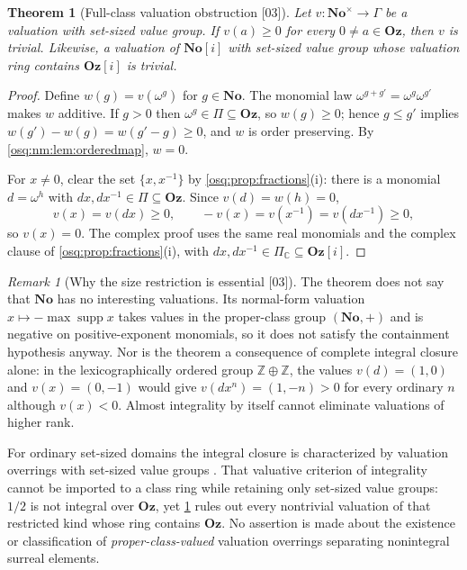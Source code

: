 \documentclass[11pt,letterpaper]{article}
\numberwithin{equation}{section}
\newtheorem{theorem}{Theorem}[section]
\theoremstyle{definition}
\theoremstyle{remark}
\newtheorem{remark}[remark]{Remark}
\theoremstyle{plain}
\newcommand{\No}{\mathbf{No}}
\newcommand{\Oz}{\mathbf{Oz}}
\newcommand{\SC}{\No[i]}
\newcommand{\GOz}{\Oz[i]}
\newcommand{\Z}{\mathbb Z}
\newcommand{\C}{\mathbb C}
\newcommand{\supp}{\operatorname{supp}}
\newcommand{\src}[1]{\textup{\textsf{[#1]}}}
\begin{document}
\begin{theorem}[Full-class valuation obstruction \src{03}]\label{osq:nm:thm:valuation}
Let $v:\No^\times\to\Gamma$ be a valuation with set-sized value group. If $v(a)\ge0$ for
every $0\ne a\in\Oz$, then $v$ is trivial. Likewise, a valuation of $\SC$ with set-sized
value group whose valuation ring contains $\GOz$ is trivial.
\end{theorem}

\begin{proof}
Define $w(g)=v(\omega^g)$ for $g\in\No$. The monomial law $\omega^{g+g'}=\omega^g\omega^{g'}$
makes $w$ additive. If $g>0$ then $\omega^g\in\Pi\subseteq\Oz$, so $w(g)\ge0$; hence
$g\le g'$ implies $w(g')-w(g)=w(g'-g)\ge0$, and $w$ is order preserving. By
\cref{osq:nm:lem:orderedmap}, $w=0$.

For $x\ne0$, clear the set $\{x,x^{-1}\}$ by \cref{osq:prop:fractions}(i): there is a
monomial $d=\omega^h$ with $dx,dx^{-1}\in\Pi\subseteq\Oz$. Since $v(d)=w(h)=0$,
\[
 v(x)=v(dx)\ge0,\qquad -v(x)=v(x^{-1})=v(dx^{-1})\ge0,
\]
so $v(x)=0$. The complex proof uses the same real monomials and the complex clause of
\cref{osq:prop:fractions}(i), with $dx,dx^{-1}\in\Pi_\C\subseteq\GOz$.
\end{proof}

\begin{remark}[Why the size restriction is essential \src{03}]\label{osq:nm:rem:valsize}
The theorem does not say that $\No$ has no interesting valuations. Its normal-form
valuation $x\mapsto-\max\supp x$ takes values in the proper-class group $(\No,+)$ and is
negative on positive-exponent monomials, so it does not satisfy the containment hypothesis
anyway. Nor is the theorem a consequence of complete integral closure alone: in the
lexicographically ordered group $\Z\oplus\Z$, the values $v(d)=(1,0)$ and $v(x)=(0,-1)$
would give $v(dx^n)=(1,-n)>0$ for every ordinary $n$ although $v(x)<0$. Almost integrality
by itself cannot eliminate valuations of higher rank.

For ordinary set-sized domains the integral closure is characterized by valuation
overrings with set-sized value groups \cite[Lemmas 10.50.3 and 10.50.11]{StacksVal}. That
valuative criterion of integrality cannot be imported to a class ring while retaining only
set-sized value groups: $1/2$ is not integral over $\Oz$, yet
\cref{osq:nm:thm:valuation} rules out every nontrivial valuation of that restricted kind
whose ring contains $\Oz$. No assertion is made about the existence or classification of
\emph{proper-class-valued} valuation overrings separating nonintegral surreal elements.
\end{remark}
\end{document}
